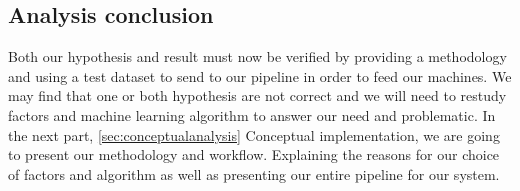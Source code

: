 \documentclass[../main.tex]{subfiles}
\begin{document}
\subsection{Analysis conclusion}
\label{subsec:analysis_conclusion}
Both our hypothesis and result must now be verified by providing a methodology and using a test dataset to send to our pipeline in order to feed our machines.
We may find that one or both hypothesis are not correct and we will need to restudy factors and machine learning algorithm to answer our need and problematic. 
In the next part, \ref{sec:conceptualanalysis} Conceptual implementation, we are going to present our methodology and workflow. Explaining the reasons for our choice of factors and algorithm as well as presenting our entire pipeline for our system.
\end{document}
